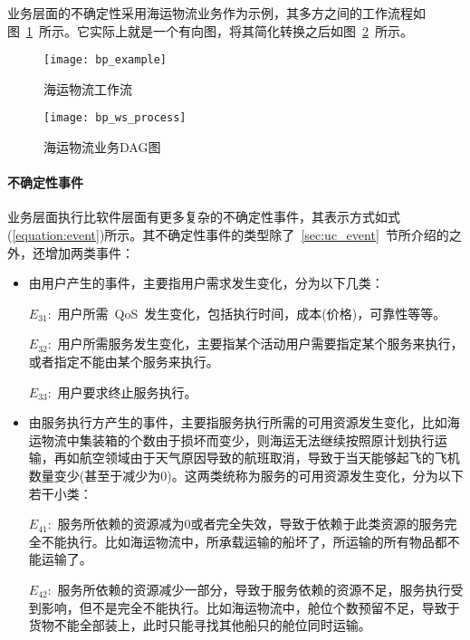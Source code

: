 业务层面的不确定性采用海运物流业务作为示例，其多方之间的工作流程如图~\ref{figure:bp_example}~所示。它实际上就是一个有向图，将其简化转换之后如图~\ref{figure:bp_ws_process}~所示。

\begin{figure}[htbp]
    \centering
    \texttt{[image: bp\_example]}
    \caption{海运物流工作流}\label{figure:bp_example}
    \vspace{-1em}
\end{figure}

\begin{figure}[htbp]
    \centering
    \texttt{[image: bp\_ws\_process]}
    \caption{海运物流业务DAG图}\label{figure:bp_ws_process}
    \vspace{-1em}
\end{figure}

\paragraph{不确定性事件} \label{sec:uc_bp}

业务层面执行比软件层面有更多复杂的不确定性事件，其表示方式如式(\ref{equation:event})所示。其不确定性事件的类型除了~\ref{sec:uc_event}~节所介绍的之外，还增加两类事件：

\begin{itemize}
    
    \item 由用户产生的事件，主要指用户需求发生变化，分为以下几类：
    
    $E_{31}$:~用户所需~QoS~发生变化，包括执行时间，成本(价格)，可靠性等等。
    
    $E_{32}$:~用户所需服务发生变化，主要指某个活动用户需要指定某个服务来执行，或者指定不能由某个服务来执行。
    
    $E_{33}$:~用户要求终止服务执行。
    
    \item 由服务执行方产生的事件，主要指服务执行所需的可用资源发生变化，比如海运物流中集装箱的个数由于损坏而变少，则海运无法继续按照原计划执行运输，再如航空领域由于天气原因导致的航班取消，导致于当天能够起飞的飞机数量变少(甚至于减少为0)。这两类统称为服务的可用资源发生变化，分为以下若干小类：
    
    $E_{41}$:~服务所依赖的资源减为0或者完全失效，导致于依赖于此类资源的服务完全不能执行。比如海运物流中，所承载运输的船坏了，所运输的所有物品都不能运输了。
    
    $E_{42}$:~服务所依赖的资源减少一部分，导致于服务依赖的资源不足，服务执行受到影响，但不是完全不能执行。比如海运物流中，舱位个数预留不足，导致于货物不能全部装上，此时只能寻找其他船只的舱位同时运输。
    
    
\end{itemize}

